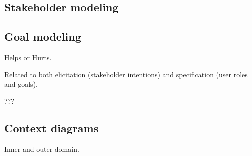 \subsection{Stakeholder modeling}

\subsection{Goal modeling}

Helps or Hurts.

Related to both elicitation (stakeholder intentions) and specification (user roles and goals).

???

\subsection{Context diagrams}

Inner and outer domain.






